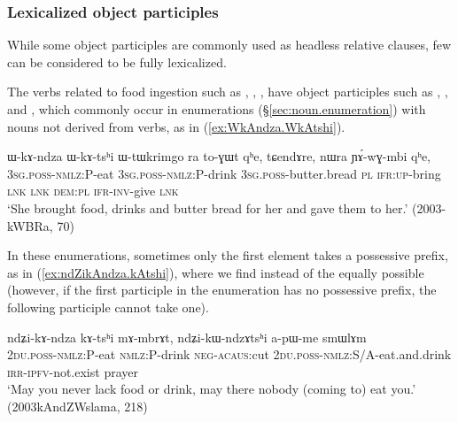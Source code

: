 \subsubsection{Lexicalized object participles} \label{sec:lexicalized.object.participle}
While some object participles are commonly used as headless relative clauses, few can be considered to be fully lexicalized. 

The verbs related to food ingestion such as , , ,  have object participles such as , ,  and , which commonly occur in enumerations (§\ref{sec:noun.enumeration}) with nouns not derived from verbs, as in (\ref{ex:WkAndza.WkAtshi}).  

\begin{exe}
\ex \label{ex:WkAndza.WkAtshi}
\gll  ɯ-kɤ-ndza ɯ-kɤ-tsʰi ɯ-tɯkrimgo ra to-ɣɯt qʰe, tɕendɤre, nɯra ɲɤ́-wɣ-mbi qʰe, \\
\textsc{3sg}.\textsc{poss}-\textsc{nmlz}:P-eat \textsc{3sg}.\textsc{poss}-\textsc{nmlz}:P-drink \textsc{3sg}.\textsc{poss}-butter.bread \textsc{pl} \textsc{ifr}:\textsc{up}-bring \textsc{lnk} \textsc{lnk} \textsc{dem}:\textsc{pl} \textsc{ifr}-\textsc{inv}-give \textsc{lnk} \\
 \glt  `She brought food, drinks and butter bread for her and gave them to her.' (2003-kWBRa, 70)
\end{exe}

In these enumerations, sometimes only the first element takes a possessive prefix, as in (\ref{ex:ndZikAndza.kAtshi}), where we find  instead of the equally possible  (however, if the first  participle in the enumeration has no possessive prefix, the following participle cannot take one).

\begin{exe}
\ex \label{ex:ndZikAndza.kAtshi}
\gll  ndʑi-kɤ-ndza kɤ-tsʰi mɤ-mbrɤt, ndʑi-kɯ-ndzɤtsʰi a-pɯ-me smɯlɤm \\
\textsc{2du}.\textsc{poss}-\textsc{nmlz}:P-eat \textsc{nmlz}:P-drink \textsc{neg}-\textsc{acaus}:cut  \textsc{2du}.\textsc{poss}-\textsc{nmlz}:S/A-eat.and.drink \textsc{irr}-\textsc{ipfv}-not.exist prayer \\
\glt `May you never lack food or drink, may there nobody (coming to) eat you.' (2003kAndZWslama, 218)
\end{exe}

